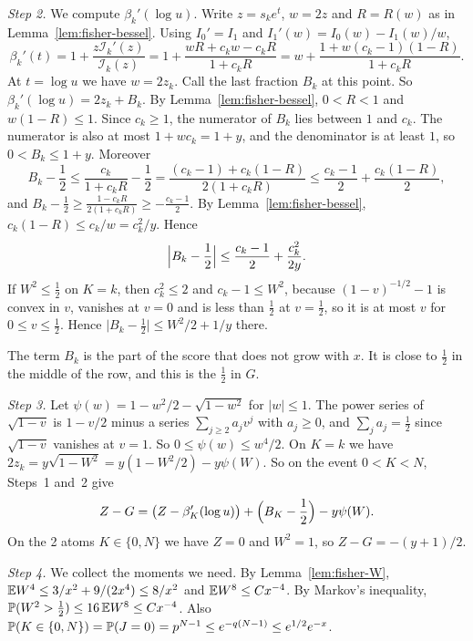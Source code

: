 \emph{Step 2.} We compute $\beta_k'(\log u)$. Write $z=s_ke^t$, $w=2z$ and
$R=R(w)$ as in Lemma~\ref{lem:fisher-bessel}. Using $I_0'=I_1$ and
$I_1'(w)=I_0(w)-I_1(w)/w$,
\[
 \beta_k'(t)=1+\frac{z\mathcal I_k'(z)}{\mathcal I_k(z)}
 =1+\frac{wR+c_kw-c_kR}{1+c_kR}=w+\frac{1+w(c_k-1)(1-R)}{1+c_kR}.
\]
At $t=\log u$ we have $w=2z_k$. Call the last fraction $B_k$ at this point.
So $\beta_k'(\log u)=2z_k+B_k$. By Lemma~\ref{lem:fisher-bessel},
$0<R<1$ and $w(1-R)\le1$. Since $c_k\ge1$, the numerator of $B_k$ lies
between $1$ and $c_k$. The numerator is also at most $1+wc_k=1+y$, and the
denominator is at least $1$, so $0<B_k\le1+y$. Moreover
\[
 B_k-\frac12\le\frac{c_k}{1+c_kR}-\frac12
 =\frac{(c_k-1)+c_k(1-R)}{2(1+c_kR)}\le\frac{c_k-1}2+\frac{c_k(1-R)}2 ,
\]
and $B_k-\frac12\ge\frac{1-c_kR}{2(1+c_kR)}\ge-\frac{c_k-1}2$. By
Lemma~\ref{lem:fisher-bessel}, $c_k(1-R)\le c_k/w=c_k^2/y$. Hence
\[
 \Bigl\lvert B_k-\frac12\Bigr\rvert\le\frac{c_k-1}2+\frac{c_k^2}{2y}.
\]
If $W^2\le\frac12$ on $K=k$, then $c_k^2\le2$ and $c_k-1\le W^2$, because
$(1-v)^{-1/2}-1$ is convex in $v$, vanishes at $v=0$ and is less than
$\frac12$ at $v=\frac12$, so it is at most $v$ for $0\le v\le\frac12$. Hence
$\lvert B_k-\frac12\rvert\le W^2/2+1/y$ there.

The term $B_k$ is the part of the score that does not grow with $x$. It is
close to $\frac12$ in the middle of the row, and this is the $\frac12$ in
$G$.

\emph{Step 3.} Let $\psi(w)=1-w^2/2-\sqrt{1-w^2}$ for $\lvert w\rvert\le1$.
The power series of $\sqrt{1-v}$ is $1-v/2$ minus a series
$\sum_{j\ge2}a_jv^j$ with $a_j\ge0$, and $\sum_ja_j=\frac12$ since
$\sqrt{1-v}$ vanishes at $v=1$. So $0\le\psi(w)\le w^4/2$. On $K=k$ we have
$2z_k=y\sqrt{1-W^2}=y(1-W^2/2)-y\psi(W)$. So on the event $0<K<N$, Steps~1
and~2 give
\[
 Z-G=\bigl(Z-\beta_K'(\log u)\bigr)+\Bigl(B_K-\frac12\Bigr)-y\psi(W).
\]
On the 2 atoms $K\in\{0,N\}$ we have $Z=0$ and $W^2=1$, so
$Z-G=-(y+1)/2$.

\emph{Step 4.} We collect the moments we need. By
Lemma~\ref{lem:fisher-W}, $\mathbb{E} W^4\le3/x^2+9/(2x^4)\le8/x^2$ and
$\mathbb{E} W^8\le Cx^{-4}$. By Markov's inequality,
$\mathbb{P}(W^2>\frac12)\le16\,\mathbb{E} W^8\le Cx^{-4}$. Also
$\mathbb{P}(K\in\{0,N\})=\mathbb{P}(J=0)=p^{N-1}\le e^{-q(N-1)}\le e^{1/2}e^{-x}$.

